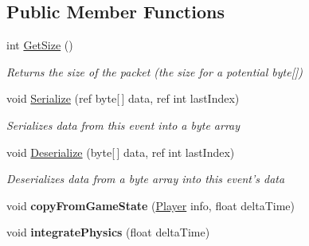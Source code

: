 \subsection*{Public Member Functions}
\begin{DoxyCompactItemize}
\item 
int \hyperlink{struct_game_state_1_1_player_a58e1b4e7eaca487703abf36826e41c45}{Get\-Size} ()
\begin{DoxyCompactList}\small\item\em Returns the size of the packet (the size for a potential byte\mbox{[}\mbox{]}) \end{DoxyCompactList}\item 
void \hyperlink{struct_game_state_1_1_player_aa8df830f0a0bcfbfb263a634d125c3a5}{Serialize} (ref byte\mbox{[}$\,$\mbox{]} data, ref int last\-Index)
\begin{DoxyCompactList}\small\item\em Serializes data from this event into a byte array \end{DoxyCompactList}\item 
void \hyperlink{struct_game_state_1_1_player_aaf7c5b93f45be35c3501626cb6759c0b}{Deserialize} (byte\mbox{[}$\,$\mbox{]} data, ref int last\-Index)
\begin{DoxyCompactList}\small\item\em Deserializes data from a byte array into this event's data \end{DoxyCompactList}\item 
\hypertarget{struct_game_state_1_1_player_ace7e3625cf1996b8c56bcafae36673af}{void {\bfseries copy\-From\-Game\-State} (\hyperlink{struct_game_state_1_1_player}{Player} info, float delta\-Time)}\label{struct_game_state_1_1_player_ace7e3625cf1996b8c56bcafae36673af}

\item 
\hypertarget{struct_game_state_1_1_player_a59ac624b5378e8253ac70d827febfe6a}{void {\bfseries integrate\-Physics} (float delta\-Time)}\label{struct_game_state_1_1_player_a59ac624b5378e8253ac70d827febfe6a}

\end{DoxyCompactItemize}
